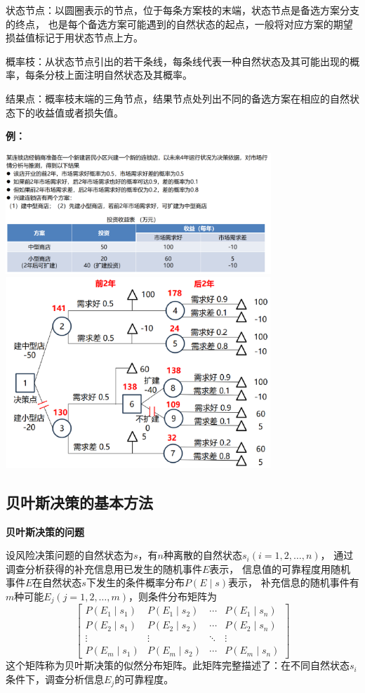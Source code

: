 \documentclass[a4paper,12pt]{article}
\begin{document}
状态节点：以圆圈表示的节点，位于每条方案枝的末端，状态节点是备选方案分支的终点，
也是每个备选方案可能遇到的自然状态的起点，一般将对应方案的期望损益值标记于用状态节点上方。

概率枝：从状态节点引出的若干条线，每条线代表一种自然状态及其可能出现的概率，每条分枝上面注明自然状态及其概率。

结果点：概率枝末端的三角节点，结果节点处列出不同的备选方案在相应的自然状态下的收益值或者损失值。

\noindent
\textbf{例：}

\begin{center}
    \includegraphics[width=10cm]{决策树例题目.png}
    \includegraphics[width=10cm]{决策树例解答.png}
\end{center}

\subsection{贝叶斯决策的基本方法}

\noindent
\textbf{贝叶斯决策的问题}

设风险决策问题的自然状态为$s$，有$n$种离散的自然状态$s_i(i=1,2,\dots,n)$，
通过调查分析获得的补充信息用已发生的随机事件$E$表示，
信息值的可靠程度用随机事件$E$在自然状态$s$下发生的条件概率分布$P\left(E\mid s\right)$表示，
补充信息的随机事件有$m$种可能$E_j(j=1,2,\dots,m)$，则条件分布矩阵为
$$
\begin{bmatrix}P\left(E_1\mid s_1\right) & P\left(E_1\mid s_2\right) & \cdots & P\left(E_1\mid s_n\right) \\P\left(E_2\mid s_1\right) & P\left(E_2\mid s_2\right) & \cdots & P\left(E_2\mid s_n\right) \\\vdots & \vdots & \ddots & \vdots \\P\left(E_m\mid s_1\right) & P\left(E_m\mid s_2\right) & \cdots & P\left(E_m\mid s_n\right)\end{bmatrix}
$$
这个矩阵称为贝叶斯决策的似然分布矩阵。此矩阵完整描述了：在不同自然状态$s_i$条件下，调查分析信息$E_j$的可靠程度。
\end{document}
